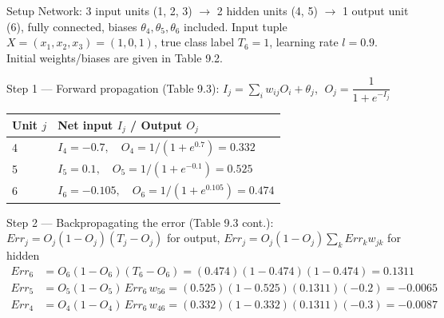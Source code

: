 \documentclass[12pt,a4paper]{article}
\begin{document}
\begin{qbox}{Setup}
Network: 3 input units (1, 2, 3) $\to$ 2 hidden units (4, 5) $\to$ 1 output unit (6), fully connected, biases $\theta_4,\theta_5,\theta_6$ included. Input tuple $X = (x_1,x_2,x_3) = (1,0,1)$, true class label $T_6 = 1$, learning rate $l = 0.9$. Initial weights/biases are given in Table 9.2.
\end{qbox}

\begin{solbox}{Step 1 --- Forward propagation (Table 9.3): $I_j = \sum_i w_{ij}O_i + \theta_j$, $\;O_j = \dfrac{1}{1+e^{-I_j}}$}
\begin{center}
\begin{tabular}{ll}
\toprule
Unit $j$ & Net input $I_j$ \quad / \quad Output $O_j$ \\
\midrule
4 & $I_4 = -0.7,\quad O_4 = 1/(1+e^{0.7}) = 0.332$ \\
5 & $I_5 = 0.1,\quad O_5 = 1/(1+e^{-0.1}) = 0.525$ \\
6 & $I_6 = -0.105,\quad O_6 = 1/(1+e^{0.105}) = 0.474$ \\
\bottomrule
\end{tabular}
\end{center}
\end{solbox}

\begin{solbox}{Step 2 --- Backpropagating the error (Table 9.3 cont.): $Err_j = O_j(1-O_j)(T_j - O_j)$ for output, $Err_j = O_j(1-O_j)\sum_k Err_k w_{jk}$ for hidden}
\begin{align*}
Err_6 &= O_6(1-O_6)(T_6 - O_6) = (0.474)(1-0.474)(1-0.474) = 0.1311\\
Err_5 &= O_5(1-O_5)\,Err_6\, w_{56} = (0.525)(1-0.525)(0.1311)(-0.2) = -0.0065\\
Err_4 &= O_4(1-O_4)\,Err_6\, w_{46} = (0.332)(1-0.332)(0.1311)(-0.3) = -0.0087
\end{align*}
\end{solbox}
\end{document}
